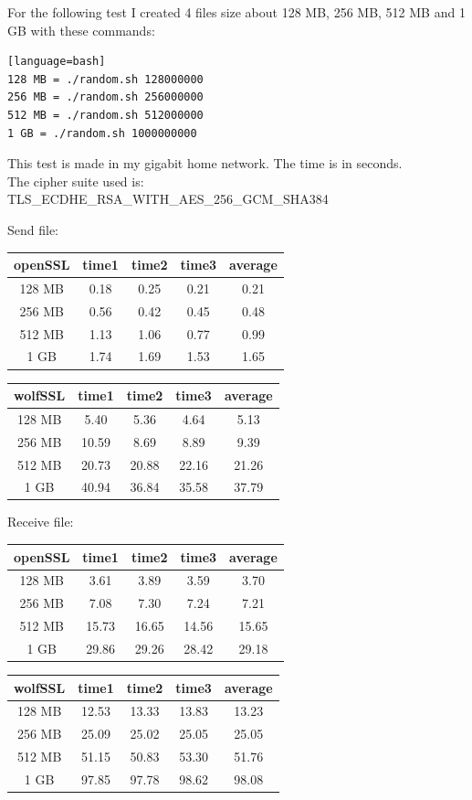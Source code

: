 \documentclass[a4paper,12pt]{article}
\begin{document}
For the following test I created 4 files size about 128 MB, 256 MB, 512 MB and 1 GB with these commands:
\begin{lstlisting}[caption={openSSL commands},captionpos=b][language=bash]
128 MB = ./random.sh 128000000
256 MB = ./random.sh 256000000
512 MB = ./random.sh 512000000
1 GB = ./random.sh 1000000000
\end{lstlisting}

This test is made in my gigabit home network.
The time is in seconds.
\\The cipher suite used is: TLS\_ECDHE\_RSA\_WITH\_AES\_256\_GCM\_SHA384

Send file:\\
\begin{tabular}{ ||c|c|c|c|c|| } 
 \hline
 \textbf{openSSL} & time1 & time2 & time3 & average \\ 
 \hline
 128 MB & 0.18& 0.25& 0.21& 0.21\\ 
 \hline
 256 MB & 0.56& 0.42& 0.45& 0.48\\ 
 \hline
 512 MB & 1.13& 1.06& 0.77& 0.99\\ 
 \hline
 1 GB  & 1.74& 1.69& 1.53& 1.65\\ 
 \hline
\end{tabular}
\newline
\begin{tabular}{ ||c|c|c|c|c|| } 
 \hline
 \textbf{wolfSSL} & time1 & time2 & time3 & average \\ 
 \hline
128 MB & 5.40& 5.36& 4.64& 5.13\\ 
 \hline
 256 MB & 10.59& 8.69& 8.89& 9.39\\ 
 \hline
 512 MB & 20.73& 20.88& 22.16& 21.26\\ 
 \hline
 1 GB  & 40.94& 36.84& 35.58& 37.79\\ 
 \hline
\end{tabular}
\newline

Receive file:\\
\begin{tabular}{ ||c|c|c|c|c|| } 
 \hline
 \textbf{openSSL} & time1 & time2 & time3 & average \\ 
 \hline
 128 MB & 3.61& 3.89& 3.59& 3.70\\ 
 \hline
 256 MB & 7.08& 7.30& 7.24& 7.21\\ 
 \hline
 512 MB & 15.73& 16.65& 14.56& 15.65\\ 
 \hline
 1 GB  & 29.86& 29.26& 28.42& 29.18\\ 
 \hline
\end{tabular}
\newline
\begin{tabular}{ ||c|c|c|c|c|| } 
 \hline
 \textbf{wolfSSL} & time1 & time2 & time3 & average \\ 
 \hline
128 MB & 12.53& 13.33& 13.83& 13.23\\ 
 \hline
 256 MB & 25.09& 25.02& 25.05& 25.05\\ 
 \hline
 512 MB & 51.15& 50.83& 53.30& 51.76\\ 
 \hline
 1 GB  & 97.85& 97.78& 98.62& 98.08\\ 
 \hline
\end{tabular}
\newline
\end{document}
